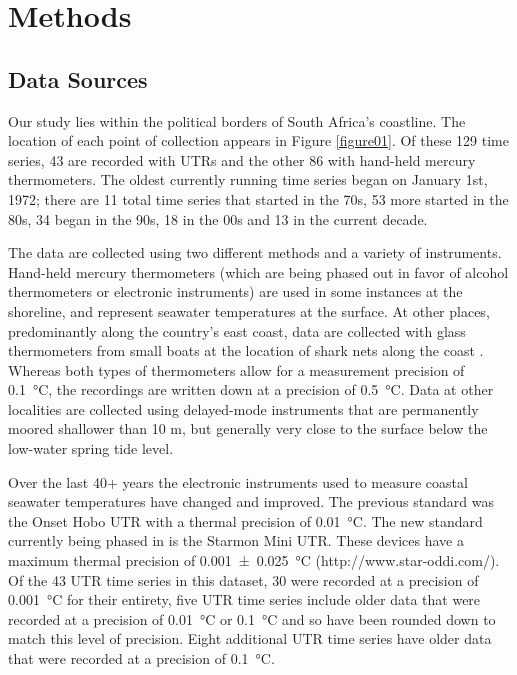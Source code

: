 \documentclass[]{ametsoc}
\begin{document}
\section{Methods}

\subsection{Data Sources}
Our study lies within the political borders of South Africa's coastline. The location of each point of collection appears in Figure \ref{figure01}. Of these 129 time series, 43 are recorded with UTRs and the other 86 with hand-held mercury thermometers. The oldest currently running time series began on January 1st, 1972; there are 11 total time series that started in the 70s, 53 more started in the 80s, 34 began in the 90s, 18 in the 00s and 13 in the current decade.

The data are collected using two different methods and a variety of instruments. Hand-held mercury thermometers (which are being phased out in favor of alcohol thermometers or electronic instruments) are used in some instances at the shoreline, and represent seawater temperatures at the surface. At other places, predominantly along the country's east coast, data are collected with glass thermometers from small boats at the location of shark nets along the coast \citep{Cliff1988}. Whereas both types of thermometers allow for a measurement precision of \SI{0.1}{\degreeCelsius}, the recordings are written down at a precision of \SI{0.5}{\degreeCelsius}. Data at other localities are collected using delayed-mode instruments that are permanently moored shallower than 10 m, but generally very close to the surface below the low-water spring tide level.

Over the last 40+ years the electronic instruments used to measure coastal seawater temperatures have changed and improved. The previous standard was the Onset Hobo UTR with a thermal precision of \SI{0.01}{\degreeCelsius}. The new standard currently being phased in is the Starmon Mini UTR. These devices have a maximum thermal precision of \SI[separate-uncertainty = true, multi-part-units = repeat]{0.001(25)}{\degreeCelsius} (http://www.star-oddi.com/). Of the 43 UTR time series in this dataset, 30 were recorded at a precision of \SI{0.001}{\degreeCelsius} for their entirety, five UTR time series include older data that were recorded at a precision of \SI{0.01}{\degreeCelsius} or \SI{0.1}{\degreeCelsius} and so have been rounded down to match this level of precision. Eight additional UTR time series have older data that were recorded at a precision of \SI{0.1}{\degreeCelsius}.
\end{document}

